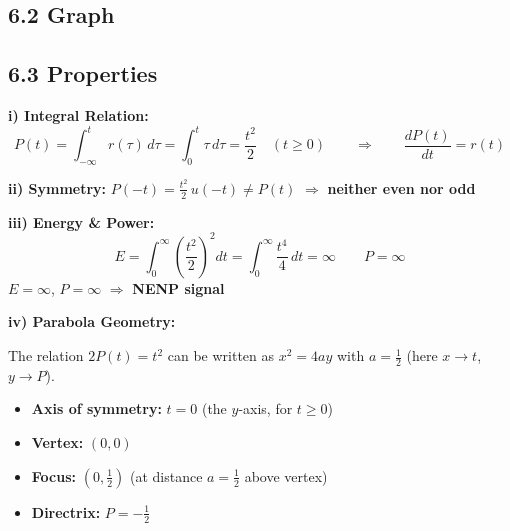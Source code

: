 \documentclass[10pt,a4paper]{article}
\begin{document}
\subsection*{6.2 Graph}

\begin{center}
\end{center}

\subsection*{6.3 Properties}

\begin{propbox}
\textbf{i) Integral Relation:}
\[
P(t) = \int_{-\infty}^{t}r(\tau)\,d\tau = \int_{0}^{t}\tau\,d\tau = \frac{t^2}{2} \quad (t \geq 0)
\qquad \Rightarrow \qquad \frac{dP(t)}{dt} = r(t)
\]

\textbf{ii) Symmetry:} $P(-t) = \frac{t^2}{2}\,u(-t) \neq P(t)$ $\Rightarrow$ \textbf{neither even nor odd}

\textbf{iii) Energy \& Power:}
\[
E = \int_{0}^{\infty}\left(\frac{t^2}{2}\right)^2 dt = \int_{0}^{\infty}\frac{t^4}{4}\,dt = \infty \qquad P = \infty
\]
$E = \infty$, $P = \infty$ $\Rightarrow$ \textbf{NENP signal}

\textbf{iv) Parabola Geometry:}

The relation $2P(t) = t^2$ can be written as $x^2 = 4ay$ with $a = \tfrac{1}{2}$ (here $x \to t$, $y \to P$).
\begin{itemize}
  \item \textbf{Axis of symmetry:} $t = 0$ (the $y$-axis, for $t \geq 0$)
  \item \textbf{Vertex:} $(0, 0)$
  \item \textbf{Focus:} $\left(0, \tfrac{1}{2}\right)$ (at distance $a = \tfrac{1}{2}$ above vertex)
  \item \textbf{Directrix:} $P = -\tfrac{1}{2}$
\end{itemize}
\end{propbox}
\end{document}

